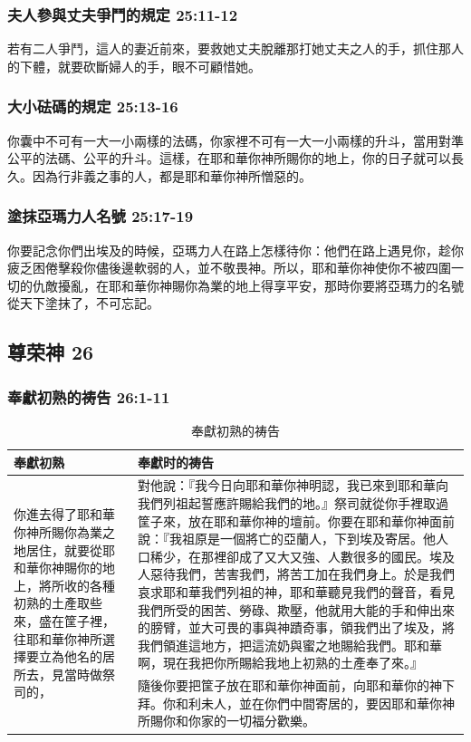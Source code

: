 \subsubsection{夫人參與丈夫爭鬥的規定 25:11-12}
若有二人爭鬥，這人的妻近前來，要救她丈夫脫離那打她丈夫之人的手，抓住那人的下體，就要砍斷婦人的手，眼不可顧惜她。

\subsubsection{大小砝碼的規定 25:13-16 }
你囊中不可有一大一小兩樣的法碼，你家裡不可有一大一小兩樣的升斗，當用對準公平的法碼、公平的升斗。這樣，在耶和華你神所賜你的地上，你的日子就可以長久。因為行非義之事的人，都是耶和華你神所憎惡的。

\subsubsection{塗抹亞瑪力人名號 25:17-19 }
你要記念你們出埃及的時候，亞瑪力人在路上怎樣待你：他們在路上遇見你，趁你疲乏困倦擊殺你儘後邊軟弱的人，並不敬畏神。所以，耶和華你神使你不被四圍一切的仇敵擾亂，在耶和華你神賜你為業的地上得享平安，那時你要將亞瑪力的名號從天下塗抹了，不可忘記。

\subsection{尊荣神 26}
\subsubsection{奉獻初熟的祷告 26:1-11}
\begin{table}[H]
\begin{center}
\begin{tabular}{ p{3.4cm}|p{13.6cm}} \toprule
奉獻初熟&奉獻时的祷告\\\hline
\multirow{3}{3.5cm}{你進去得了耶和華你神所賜你為業之地居住，就要從耶和華你神賜你的地上，將所收的各種初熟的土產取些來，盛在筐子裡，往耶和華你神所選擇要立為他名的居所去，見當時做祭司的，} 
&對他說：『我今日向耶和華你神明認，我已來到耶和華向我們列祖起誓應許賜給我們的地。』祭司就從你手裡取過筐子來，放在耶和華你神的壇前。你要在耶和華你神面前說：『我祖原是一個將亡的亞蘭人，下到埃及寄居。他人口稀少，在那裡卻成了又大又強、人數很多的國民。埃及人惡待我們，苦害我們，將苦工加在我們身上。於是我們哀求耶和華我們列祖的神，耶和華聽見我們的聲音，看見我們所受的困苦、勞碌、欺壓，他就用大能的手和伸出來的膀臂，並大可畏的事與神蹟奇事，領我們出了埃及，將我們領進這地方，把這流奶與蜜之地賜給我們。耶和華啊，現在我把你所賜給我地上初熟的土產奉了來。』\\\cline{2-2}
&隨後你要把筐子放在耶和華你神面前，向耶和華你的神下拜。你和利未人，並在你們中間寄居的，要因耶和華你神所賜你和你家的一切福分歡樂。\\\hline
\end{tabular}
\end{center}
\caption{奉獻初熟的祷告}
\end{table}


